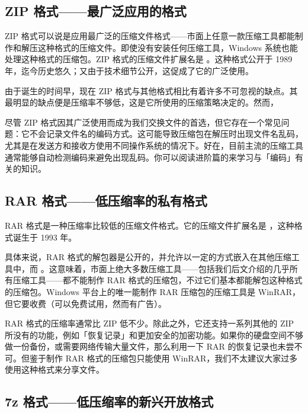 \subsection{ZIP 格式——最广泛应用的格式}

ZIP 格式可以说是应用最广泛的压缩文件格式——市面上任意一款压缩工具都能制作和解压这种格式的压缩文件。即使没有安装任何压缩工具，Windows 系统也能处理这种格式的压缩包。ZIP 格式的压缩文件扩展名是 。这种格式公开于 1989 年，迄今历史悠久；又由于技术细节公开，这促成了它的广泛使用。

由于诞生的时间早，现在 ZIP 格式与其他格式相比有着许多不可忽视的缺点。其最明显的缺点便是压缩率不够低，这是它所使用的压缩策略决定的。然而，

\begin{note}
  尽管 ZIP 格式因其广泛使用而成为我们交换文件的首选，但它存在一个常见问题：它不会记录文件名的编码方式。这可能导致压缩包在解压时出现文件名乱码，尤其是在发送方和接收方使用不同操作系统的情况下。好在，目前主流的压缩工具通常能够自动检测编码来避免出现乱码。你可以阅读进阶篇的来学习与「编码」有关的知识。
\end{note}
\subsection{RAR 格式——低压缩率的私有格式}
RAR 格式是一种压缩率比较低的压缩文件格式。它的压缩文件扩展名是 ，这种格式诞生于 1993 年。

具体来说，RAR 格式的解包器是公开的，并允许以一定的方式嵌入在其他压缩工具中，而 。这意味着，市面上绝大多数压缩工具——包括我们后文介绍的几乎所有压缩工具——都不能制作 RAR 格式的压缩包，不过它们基本都能解包这种格式的压缩包。Windows 平台上的唯一能制作 RAR 压缩包的压缩工具是 WinRAR，但它要收费（可以免费试用，然而有广告）。

RAR 格式的压缩率通常比 ZIP 低不少。除此之外，它还支持一系列其他的 ZIP 所没有的功能，例如「恢复记录」和更加安全的加密功能。如果你的硬盘空间不够做一份备份，或需要网络传输大量文件，那么利用一下 RAR 的恢复记录也未尝不可。但鉴于制作 RAR 格式的压缩包只能使用 WinRAR，我们不太建议大家过多使用这种格式来分享文件。

\subsection{7z 格式——低压缩率的新兴开放格式}

